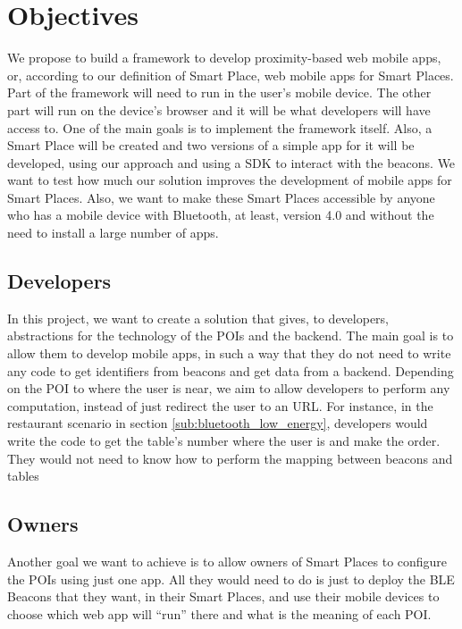 
% 
% 

\section{Objectives}
\label{sec:objectives}

We propose
to build a framework to develop proximity-based web mobile
apps, or, according to our definition of Smart Place, web
mobile apps for Smart Places.
Part of the framework will need to run in the user's 
mobile device.
The other part will run on the device's browser and
it will be what developers will have access to.
One of the main goals is to implement the framework itself.
Also, a Smart Place will be created and 
two versions of a simple
app for it will be developed, using our approach and using a SDK to interact with the beacons.
We want to test how much our solution improves the
development of mobile apps for Smart Places.
Also, we want to make these Smart Places accessible by 
anyone who has a mobile device with Bluetooth, at least,
version 4.0 and without the need to install a large number
of apps.

\subsection{Developers}
\label{sub:developers}
In this project, we want to create a solution that
gives, to developers, abstractions for the technology
of the POIs and the backend. The main goal is
to allow them to develop mobile apps, in such a way
that they do not need to write any code to get
identifiers from beacons and get data from a backend.
Depending on the POI to where the user is near, 
we aim to allow developers to perform any computation,
instead of just redirect the user to an URL.
For instance, in the restaurant scenario in section
\ref{sub:bluetooth_low_energy}, developers would
write the code to get the table's number where the
user is and make the order. They would not need
to know how to perform the mapping between beacons
and tables

\subsection{Owners}
\label{sub:owners}
Another goal we want to achieve is to allow owners of
Smart Places to configure the POIs using just one app.
All they would need to do is just to deploy the BLE Beacons
that they want, in their Smart Places, and use their
mobile devices
to choose which web app will ``run'' there and what 
is the meaning of each POI.

